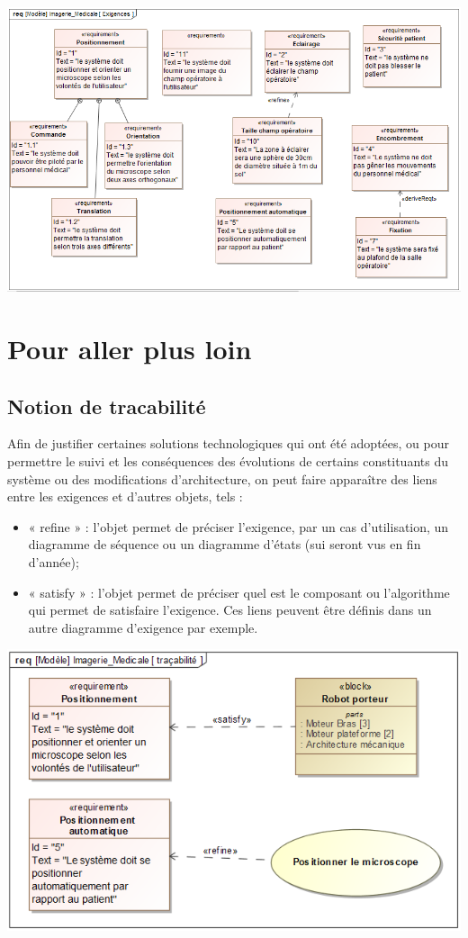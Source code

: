 \documentclass[11pt,oneside]{article}
\begin{document}
\begin{center}
\includegraphics[width=.9\textwidth]{png/imagerie_req}
\end{center}

\section{Pour aller plus loin}
\subsection{Notion de tracabilité}
Afin de justifier certaines solutions technologiques qui ont été adoptées, ou pour permettre le suivi et les conséquences des évolutions de certains constituants du système ou des modifications d’architecture, on peut faire apparaître des liens entre les exigences et d’autres objets, tels :
\begin{itemize}
\item « refine » : l’objet permet de préciser l’exigence, par un cas d’utilisation, un diagramme de séquence ou un diagramme d’états (sui seront vus en fin d’année);
\item « satisfy » : l’objet permet de préciser quel est le composant ou l’algorithme qui permet de satisfaire l’exigence.
Ces liens peuvent être définis dans un autre diagramme d’exigence par exemple.
\end{itemize}

\begin{center}
\includegraphics[width=.8\textwidth]{png/tracabilite}
\end{center}
\end{document}
